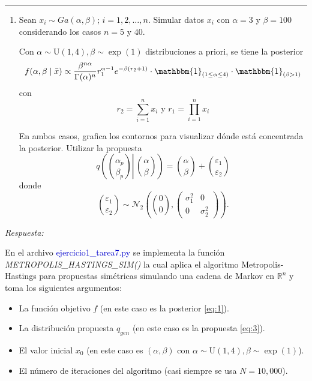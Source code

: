 \vspace{5mm}
{\color{lightgray} \hrule}
\begin{enumerate}
	\item Sean $x_i \sim G a(\alpha, \beta)$; $i=1,2, \ldots, n$. Simular datos $x_i$ con $\alpha=3$ y $\beta=100$ considerando los casos $n=5$ y $40$.
	
	Con $\alpha \sim \mathrm{U}(1,4), \beta \sim \exp (1)$ distribuciones a priori, se tiene la posterior
	\begin{equation} \label{eq:1}
		 f(\alpha, \beta \mid \bar{x}) \propto \frac{\beta^{n \alpha}}{\Gamma(\alpha)^n} r_1^{\alpha-1} e^{-\beta\left(r_2+1\right)} \cdot \mathbbm{1}_{(1 \leq \alpha \leq 4)} \cdot \mathbbm{1}_{(\beta>1)}
	\end{equation}
	con
	\begin{equation} \label{eq:2}
		r_2= \sum_{i=1}^n x_i \text { y } r_1=\prod_{i=1}^n x_i
	\end{equation}
	
	En ambos casos, grafica los contornos para visualizar dónde está concentrada la posterior. Utilizar la propuesta
	\begin{equation} \label{eq:3}
		q\left(\left.\binom{\alpha_p}{\beta_p} \right\rvert\,\binom{\alpha}{\beta}\right)=\binom{\alpha}{\beta}+\binom{\varepsilon_1}{\varepsilon_2}
	\end{equation}
	donde
	\begin{equation}
		\binom{\varepsilon_1}{\varepsilon_2} \sim \mathcal{N}_2\left( \binom{0}{0}, \left(
		\begin{array}{cc}
			\sigma_1^2 & 0 \\
			0 & \sigma_2^2
		\end{array}
		\right)\right).
	\end{equation}
\end{enumerate}

\textcolor{BrickRed}{\it Respuesta:}

En el archivo \textcolor{mediumblue}{ejercicio1\_tarea7.py} se implementa la función \textit{METROPOLIS\_HASTINGS\_SIM()} la cual aplica el algoritmo Metropolis-Hastings para propuestas simétricas simulando una cadena de Markov en $\mathbb{R}^n$ y toma los siguientes argumentos:
\begin{itemize}
	\item La función objetivo $f$ (en este caso es la posterior \eqref{eq:1}).
	\item La distribución propuesta $q_{gen}$ (en este caso es la propuesta \eqref{eq:3}).
	\item El valor inicial $x_0$ (en este caso es $(\alpha, \beta)$ con $\alpha \sim \mathrm{U}(1,4), \beta \sim \exp (1)$).
	\item El número de iteraciones del algoritmo (casi siempre se usa $N = 10,000$).
\end{itemize}

